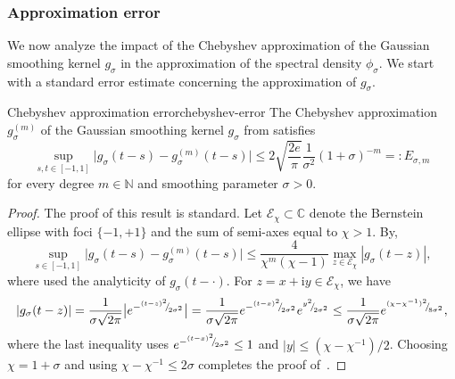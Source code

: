 \subsubsection{Approximation error}
\label{subsubsec:approximation-error}

We now analyze the impact of the Chebyshev approximation of the Gaussian smoothing kernel $g_{\sigma}$ in the approximation of the spectral density $\phi_{\sigma}$. We start with a standard error estimate concerning the approximation of $g_{\sigma}$.

\begin{lemma}{Chebyshev approximation error}{chebyshev-error}
    The Chebyshev approximation $g_{\sigma}^{(m)}$ of the Gaussian smoothing kernel $g_{{\sigma}}$ from   satisfies
    \begin{equation}
        \sup_{s,t \in [-1, 1]} \big| g_{\sigma}(t - s) - g_{\sigma}^{(m)}(t - s) \big| \leq 2\sqrt{\frac{2e}{\pi}} \frac{1}{\sigma^2} (1 + \sigma)^{-m} =: E_{\sigma, m}
        \label{equ:chebyshev-interpolation-sup-error-kernel}
    \end{equation}
    for every degree $m \in \mathbb{N}$ and smoothing parameter $\sigma > 0$.
\end{lemma}
\begin{proof}
    The proof of this result is standard. %
    Let $\mathcal{E}_{\chi} \subset \mathbb{C}$ denote the Bernstein ellipse  with foci $\{-1, +1\}$ and the sum of semi-axes equal to $\chi > 1$. By\cite[Theorem 8.2]{trefethen-2020-approximation-theory},
    \begin{equation}
        \sup_{s \in [-1, 1]} \big| g_{\sigma}(t - s) - g_{\sigma}^{(m)}(t - s) \big| \leq \frac{4}{\chi^m (\chi - 1)} \max_{z \in \mathcal{E}_{\chi}} |g_{\sigma}(t - z)|,
        \label{equ:bernstein-bound}
    \end{equation}
    where used the analyticity of $g_{\sigma}(t- \cdot)$.
    For $z = x + \mathrm{i} y \in \mathcal{E}_{\chi}$, we have
    \begin{equation}
    | g_{\sigma}(t - z) | 
    = \frac{1}{\sigma \sqrt{2 \pi}} \big| e^{-{}^{(t - z)^2}{\mskip -5mu/\mskip -3mu}_{2\sigma^2}} \big|
    = \frac{1}{\sigma \sqrt{2 \pi}} e^{-{}^{(t - x)^2}{\mskip -5mu/\mskip -3mu}_{2\sigma^2}}e^{{}^{y^2}{\mskip -5mu/\mskip -3mu}_{2\sigma^2}}
    \le \frac{1}{\sigma \sqrt{2 \pi}} e^{{}^{(\chi - \chi^{-1})^2}{\mskip -5mu/\mskip -3mu}_{8 \sigma^2}},
    \end{equation}
    where the last inequality uses 
    $e^{-{}^{(t - x)^2}{\mskip -5mu/\mskip -3mu}_{2\sigma^2}} \leq 1$ and $|y| \le (\chi - \chi^{-1}) / 2$.
    Choosing $\chi = 1 + \sigma$ and using $\chi - \chi^{-1} \leq 2\sigma$ completes the proof of~.
\end{proof}

